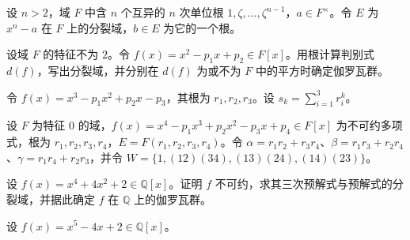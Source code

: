 \newpage
\noindent\begin{minipage}{\textwidth}
设 $n>2$，域 $F$ 中含 $n$ 个互异的 $n$ 次单位根 $1,\zeta,\ldots,\zeta^{n-1}$，$a\in F^\times$。令 $E$ 为 $x^n-a$ 在 $F$ 上的分裂域，$b\in E$ 为它的一个根。
\end{minipage}\par\vfill
\noindent\begin{minipage}{\textwidth}
设域 $F$ 的特征不为 $2$。令 $f(x)=x^2-p_1x+p_2\in F[x]$。用根计算判别式 $d(f)$，写出分裂域，并分别在 $d(f)$ 为或不为 $F$ 中的平方时确定伽罗瓦群。
\end{minipage}\par\vfill
\noindent\begin{minipage}{\textwidth}
令 $f(x)=x^3-p_1x^2+p_2x-p_3$，其根为 $r_1,r_2,r_3$。设 $s_k=\sum_{i=1}^3r_i^k$。
\end{minipage}\par\vfill
\newpage
\noindent\begin{minipage}{\textwidth}
设 $F$ 为特征 $0$ 的域，$f(x)=x^4-p_1x^3+p_2x^2-p_3x+p_4\in F[x]$ 为不可约多项式，根为 $r_1,r_2,r_3,r_4$，$E=F(r_1,r_2,r_3,r_4)$。令 $\alpha=r_1r_2+r_3r_4$、$\beta=r_1r_3+r_2r_4$、$\gamma=r_1r_4+r_2r_3$，并令 $W=\{1,(12)(34),(13)(24),(14)(23)\}$。
\end{minipage}\par\vfill
\noindent\begin{minipage}{\textwidth}
设 $f(x)=x^4+4x^2+2\in\mathbb Q[x]$。证明 $f$ 不可约，求其三次预解式与预解式的分裂域，并据此确定 $f$ 在 $\mathbb Q$ 上的伽罗瓦群。
\end{minipage}\par\vfill
\noindent\begin{minipage}{\textwidth}
设 $f(x)=x^5-4x+2\in\mathbb Q[x]$。
\end{minipage}\par\vfill
